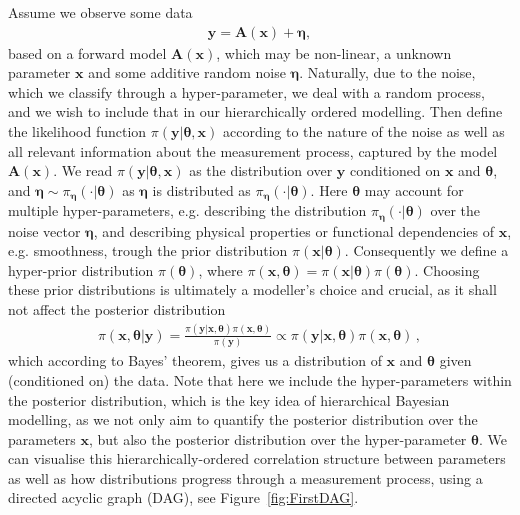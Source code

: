Assume we observe some data
\begin{align}
	\bm{y} = \bm{A} (\bm{x}) + \bm{\eta},
	\label{eq:NonLinDat}
\end{align}
based on a forward model $\bm{A}(\bm{x})$, which may be non-linear, a unknown parameter $\bm{x}$ and some additive random noise $\bm{\eta}$.
Naturally, due to the noise, which we classify through a hyper-parameter, we deal with a random process, and we wish to include that in our hierarchically ordered modelling.
Then define the likelihood function $\pi(\bm{y}|\bm{\theta},\bm{x})$ according to the nature of the noise as well as all relevant information about the measurement process, captured by the model $\bm{A}(\bm{x})$.
We read $\pi(\bm{y}|\bm{\theta},\bm{x})$ as the distribution over $\bm{y}$ conditioned on $\bm{x}$ and $\bm{\theta}$, and $\bm{\eta} \sim \pi_{\bm{\eta}}(\cdot|\bm{\theta})$ as $\bm{\eta}$ is distributed as $\pi_{\bm{\eta}}(\cdot|\bm{\theta})$.
Here $\bm{\theta}$ may account for multiple hyper-parameters, e.g. describing the distribution $\pi_{\bm{\eta}}(\cdot|\bm{\theta})$ over the noise vector $\bm{\eta}$, and describing physical properties or functional dependencies of $\bm{x}$, e.g. smoothness, trough the prior distribution $\pi(\bm{x}|\bm{\theta})$.
Consequently we define a hyper-prior distribution $\pi(\bm{\theta})$, where $\pi(\bm{x}, \bm{\theta}) = \pi(\bm{x}|\bm{\theta}) \pi(\bm{\theta}) $.
Choosing these prior distributions is ultimately a modeller's choice and crucial, as it shall not affect the posterior distribution 
\begin{align}
	\pi(\bm{x},\bm{\theta}|\bm{y}) = \frac{ \pi(\bm{y} | \bm{x}, \bm{\theta} ) \pi(\bm{x}, \bm{\theta})}{\pi(\bm{y})} \propto \pi(\bm{y} | \bm{x}, \bm{\theta} ) \pi(\bm{x}, \bm{\theta}) \, ,
\end{align}
which according to Bayes' theorem, gives us a distribution of $\bm{x}$ and $\bm{\theta}$ given (conditioned on) the data.
Note that here we include the hyper-parameters within the posterior distribution, which is the key idea of hierarchical Bayesian modelling, as we not only aim to quantify the posterior distribution over the parameters $\bm{x}$, but also the posterior distribution over the hyper-parameter $\bm{\theta}$.
We can visualise this hierarchically-ordered correlation structure between parameters as well as how distributions progress through a measurement process, using a directed acyclic graph (DAG), see Figure~\ref{fig:FirstDAG}.


